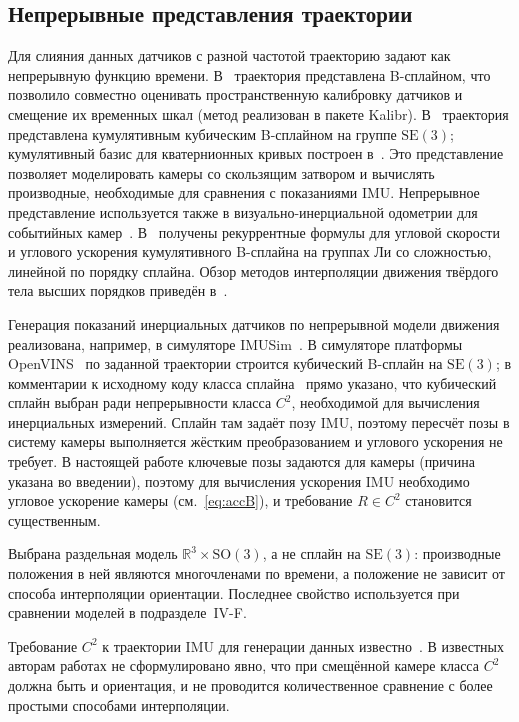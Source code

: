 \documentclass{misisarticle}
\newcommand{\R}{\mathbb{R}}
\newcommand{\SO}{\mathrm{SO}(3)}
\begin{document}
\subsection{Непрерывные представления траектории}

Для слияния данных датчиков с разной частотой траекторию задают как непрерывную функцию времени. В~\cite{furgale} траектория представлена B-сплайном, что позволило совместно оценивать пространственную калибровку датчиков и смещение их временных шкал (метод реализован в пакете Kalibr). В~\cite{lovegrove, patronperez} траектория представлена кумулятивным кубическим B-сплайном на группе $\mathrm{SE}(3)$; кумулятивный базис для кватернионных кривых построен в~\cite{kim}. Это представление позволяет моделировать камеры со скользящим затвором и вычислять производные, необходимые для сравнения с показаниями IMU. Непрерывное представление используется также в визуально-инерциальной одометрии для событийных камер~\cite{mueggler}. В~\cite{sommer} получены рекуррентные формулы для угловой скорости и углового ускорения кумулятивного B-сплайна на группах Ли со сложностью, линейной по порядку сплайна. Обзор методов интерполяции движения твёрдого тела высших порядков приведён в~\cite{haarbach}.

Генерация показаний инерциальных датчиков по непрерывной модели движения реализована, например, в симуляторе IMUSim~\cite{imusim}. В симуляторе платформы OpenVINS~\cite{openvins} по заданной траектории строится кубический B-сплайн на $\mathrm{SE}(3)$; в комментарии к исходному коду класса сплайна~\cite{ovcode} прямо указано, что кубический сплайн выбран ради непрерывности класса $C^2$, необходимой для вычисления инерциальных измерений. Сплайн там задаёт позу IMU, поэтому пересчёт позы в систему камеры выполняется жёстким преобразованием и углового ускорения не требует. В настоящей работе ключевые позы задаются для камеры (причина указана во введении), поэтому для вычисления ускорения IMU необходимо угловое ускорение камеры (см.~\eqref{eq:accB}), и требование $R\in C^2$ становится существенным.

Выбрана раздельная модель $\R^3\times\SO$, а не сплайн на $\mathrm{SE}(3)$: производные положения в ней являются многочленами по времени, а положение не зависит от способа интерполяции ориентации. Последнее свойство используется при сравнении моделей в подразделе~IV-F.

Требование $C^2$ к траектории IMU для генерации данных известно~\cite{ovcode}. В известных авторам работах не сформулировано явно, что при смещённой камере класса $C^2$ должна быть и ориентация, и не проводится количественное сравнение с более простыми способами интерполяции.
\end{document}
